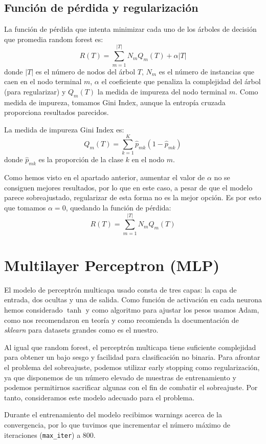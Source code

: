 \documentclass[a4]{article}
\begin{document}
\subsection{Función de pérdida y regularización}

La función de pérdida que intenta minimizar cada uno de los árboles de
decisión que promedia random forest es:
\[R(T) = \sum\limits_{m=1}^{|T|} N_mQ_m(T) + \alpha|T|\] donde $|T|$ es el número de nodos del árbol $T$, $N_m$ es el número de instancias que caen en el nodo terminal $m$, $\alpha$ el coeficiente que penaliza la complejidad del árbol (para regularizar) y $Q_m(T)$ la medida de impureza del nodo terminal $m$. Como medida de impureza, tomamos Gini Index, aunque la entropía cruzada proporciona resultados parecidos.

La medida de impureza Gini Index es:
\[Q_m(T) = \sum\limits_{k=1}^{K} \hat p_{mk}(1 - \hat p_{mk})\] donde
$\hat p_{mk}$ es la proporción de la clase $k$ en el nodo $m$.

Como hemos visto en el apartado anterior, aumentar el valor de $\alpha$ no se consiguen mejores resultados, por lo que en este caso, a pesar de que el modelo parece sobreajustado, regularizar de esta forma no es la mejor opción. Es por esto que tomamos $\alpha = 0$, quedando la función de pérdida:
\[R(T) = \sum\limits_{m=1}^{|T|} N_mQ_m(T)\]

\section{Multilayer Perceptron (MLP)}

El modelo de perceptrón multicapa usado consta de tres capas: la capa
de entrada, dos ocultas y una de salida. Como función de activación en
cada neurona hemos considerado $\tanh$ y como algoritmo para ajustar
los pesos usamos Adam, como nos recomendaron en teoría y como
recomienda la documentación de \textit{sklearn} para datasets grandes
como es el nuestro.

Al igual que random forest, el perceptrón multicapa tiene suficiente
complejidad para obtener un bajo sesgo y facilidad para clasificación
no binaria. Para afrontar el problema del sobreajuste, podemos
utilizar early stopping como regularización, ya que disponemos de un
número elevado de muestras de entrenamiento y podemos permitirnos
sacrificar algunas con el fin de combatir el sobreajuste. Por tanto,
consideramos este modelo adecuado para el problema.

Durante el entrenamiento del modelo recibimos warnings acerca de la convergencia, por lo que tuvimos que incrementar el número máximo de iteraciones (\texttt{max\_iter}) a $800$. 
\end{document}
